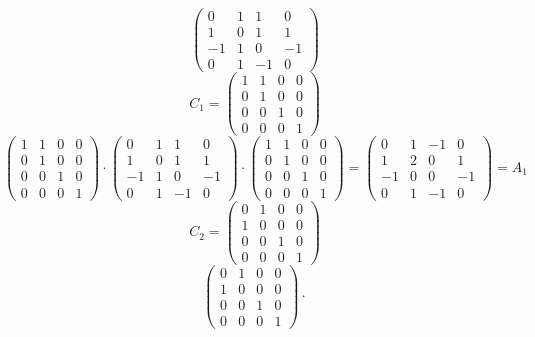 \documentclass[a4paper]{article}
\theoremstyle{definition}
\begin{document}
\[
  \begin{pmatrix}
    0 & 1 & 1 & 0 \\
    1 & 0 & 1 & 1 \\
    -1 & 1 & 0 & -1 \\
    0 & 1 & -1 & 0
  \end{pmatrix}
\] \[
  C_1 = \begin{pmatrix}
    1 & 1 & 0 & 0 \\
    0 & 1 & 0 & 0 \\
    0 & 0 & 1 & 0 \\
    0 & 0 & 0 & 1
  \end{pmatrix}
\] \[
  \begin{pmatrix}
    1 & 1 & 0 & 0 \\
    0 & 1 & 0 & 0 \\
    0 & 0 & 1 & 0 \\
    0 & 0 & 0 & 1
  \end{pmatrix}
  \cdot
  \begin{pmatrix}
    0 & 1 & 1 & 0 \\
    1 & 0 & 1 & 1 \\
    -1 & 1 & 0 & -1 \\
    0 & 1 & -1 & 0
  \end{pmatrix}
  \cdot
  \begin{pmatrix}
    1 & 1 & 0 & 0 \\
    0 & 1 & 0 & 0 \\
    0 & 0 & 1 & 0 \\
    0 & 0 & 0 & 1
  \end{pmatrix}
  =
  \begin{pmatrix}
    0 & 1 & -1 & 0 \\
    1 & 2 & 0 & 1 \\
    -1 & 0 & 0 & -1 \\
    0 & 1 & -1 & 0
  \end{pmatrix}
  = A_1
\] \[
  C_2 = \begin{pmatrix}
    0 & 1 & 0 & 0 \\
    1 & 0 & 0 & 0 \\
    0 & 0 & 1 & 0 \\
    0 & 0 & 0 & 1
  \end{pmatrix}
\] \[
  \begin{pmatrix}
    0 & 1 & 0 & 0 \\
    1 & 0 & 0 & 0 \\
    0 & 0 & 1 & 0 \\
    0 & 0 & 0 & 1
  \end{pmatrix}
  \cdot
\]
\end{document}
